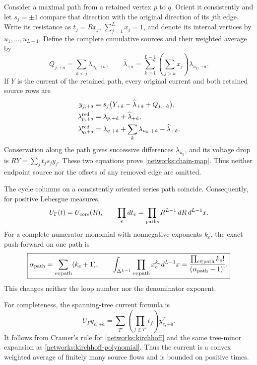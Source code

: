 Consider a maximal path from a retained vertex $p$ to $q$.  Orient it
consistently and let $s_j=\pm1$ compare that direction with the original
direction of its $j$th edge.  Write its resistance as $t_j=Rx_j$,
$\sum_{j=1}^Lx_j=1$, and denote its internal vertices by
$u_1,\ldots,u_{L-1}$.  Define the complete cumulative sources and their
weighted average by
\begin{equation}
 Q_{j,+\dot a}=\sum_{k<j}\lambda_{u_k,+\dot a},\qquad
 \widehat\lambda_{+\dot a}
   =\sum_{k=1}^{L-1}\left(\sum_{j>k}x_j\right)\lambda_{u_k,+\dot a}.
 \label{networks:chain-sources}
\end{equation}
If $Y$ is the current of the retained path, every original current and
both retained source rows are
\begin{align}
 y_{j,+\dot a}&=s_j\bigl(Y_{+\dot a}-\widehat\lambda_{+\dot a}
                                  +Q_{j,+\dot a}\bigr),\\
 \lambda_{p,+\dot a}^{\rm red}&=\lambda_{p,+\dot a}
                                      +\widehat\lambda_{+\dot a},\\
 \lambda_{q,+\dot a}^{\rm red}&=\lambda_{q,+\dot a}
              +\sum_k\lambda_{u_k,+\dot a}-\widehat\lambda_{+\dot a}.
 \label{networks:chain-map}
\end{align}
Conservation along the path gives successive differences $\lambda_{u_k}$,
and its voltage drop is $R Y=\sum_jt_js_jy_j$.  These two equations prove
\eqref{networks:chain-map}.  Thus neither endpoint source nor the offsets
of any removed edge are omitted.

The cycle columns on a consistently oriented series path coincide.
Consequently, for positive Lebesgue measures,
\begin{equation}
 U_\Gamma(t)=U_{\rm core}(R),\qquad
 \prod_e dt_e=\prod_{\text{paths}}R^{L-1}\,dR\,d^{L-1}x.
 \label{networks:chain-measure}
\end{equation}
For a complete numerator monomial with nonnegative exponents $k_e$, the
exact push-forward on one path is
\begin{equation}
 \boxed{\alpha_{\rm path}=\sum_{e\in\rm path}(k_e+1),\qquad
 \int_{\Delta^{L-1}}\prod_{e\in\rm path}x_e^{k_e}d^{L-1}x
       =\frac{\prod_{e\in\rm path}k_e!}{(\alpha_{\rm path}-1)!}.}
 \label{networks:chain-factor}
\end{equation}
This changes neither the loop number nor the denominator exponent.

For completeness, the spanning-tree current formula is
\begin{equation}
 U_\Gamma y_{e,+\dot a}
 =\sum_{T'}\left(\prod_{f\notin T'}t_f\right)y^{T'}_{e,+\dot a}.
 \label{networks:tree-current}
\end{equation}
It follows from Cramer's rule for \eqref{networks:kirchhoff} and the same
tree-minor expansion as \eqref{networks:kirchhoff-polynomial}.  Thus the
current is a convex weighted average of finitely many source flows and
is bounded on positive times.


